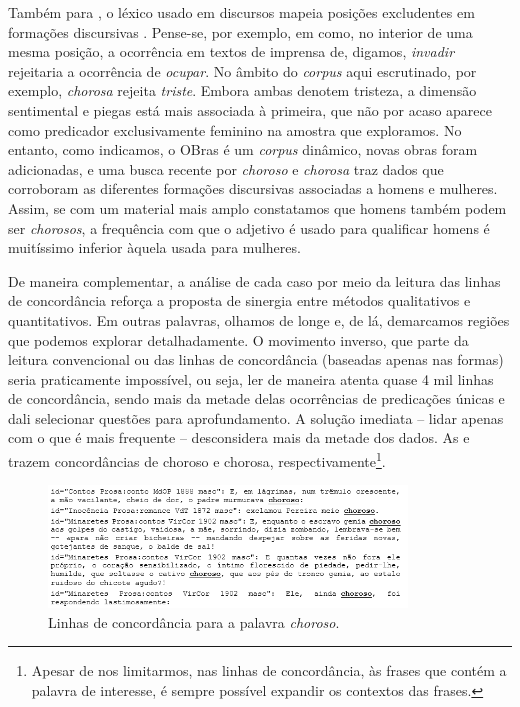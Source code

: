 \documentclass[portuguese]{textolivre}
\begin{document}
Também para \textcite{possenti2004}, o léxico usado em discursos mapeia posições excludentes em formações discursivas \cite{foucault1969}. Pense-se, por exemplo, em como, no interior de uma mesma posição, a ocorrência em textos de imprensa de, digamos, \textit{invadir} rejeitaria a ocorrência de \textit{ocupar}. No âmbito do \textit{corpus} aqui escrutinado, por exemplo, \textit{chorosa} rejeita \textit{triste}. Embora ambas denotem tristeza, a dimensão sentimental e piegas está mais associada à primeira, que não por acaso aparece como predicador exclusivamente feminino na amostra que exploramos. No entanto, como indicamos, o OBras é um \textit{corpus} dinâmico, novas obras foram adicionadas, e uma busca recente por \textit{choroso} e \textit{chorosa} traz dados que corroboram as diferentes formações discursivas associadas a homens e mulheres. Assim, se com um material mais amplo constatamos que homens também podem ser \textit{chorosos}, a frequência com que o adjetivo é usado para qualificar homens é muitíssimo inferior àquela usada para mulheres.

De maneira complementar, a análise de cada caso por meio da leitura das linhas de concordância reforça a proposta de sinergia entre métodos qualitativos e quantitativos. Em outras palavras, olhamos de longe e, de lá, demarcamos regiões que podemos explorar detalhadamente. O movimento inverso, que parte da leitura convencional ou das linhas de concordância (baseadas apenas nas formas) seria praticamente impossível, ou seja, ler de maneira atenta quase 4 mil linhas de concordância, sendo mais da metade delas ocorrências de predicações únicas e dali selecionar questões para aprofundamento. A solução imediata – lidar apenas com o que é mais frequente – desconsidera mais da metade dos dados. As  e  trazem concordâncias de choroso e chorosa, respectivamente\footnote{Apesar de nos limitarmos, nas linhas de concordância, às frases que contém a palavra de interesse, é sempre possível expandir os contextos das frases.}.

\begin{figure}[htbp]
 \centering
 \includegraphics[width=0.85\textwidth]{Fig3.png}
 \caption{Linhas de concordância para a palavra \textit{choroso}.}
 \label{fig3}
\end{figure}
\end{document}
